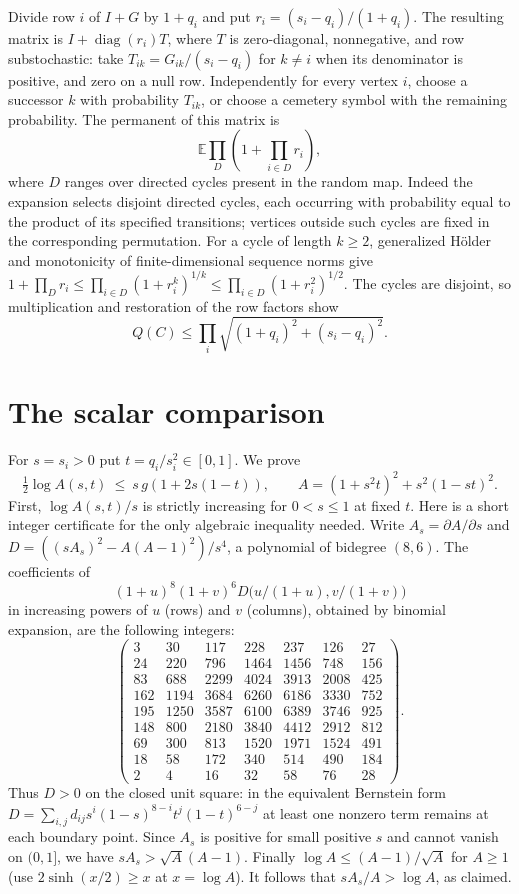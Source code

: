 \documentclass[11pt]{article}
\newcommand{\E}{\mathbb E}
\begin{document}
Divide row $i$ of $I+G$ by $1+q_i$ and put
$r_i=(s_i-q_i)/(1+q_i)$. The resulting matrix is
$I+\operatorname{diag}(r_i)T$, where $T$ is zero-diagonal,
nonnegative, and row substochastic: take $T_{ik}=G_{ik}/(s_i-q_i)$
for $k\ne i$ when its denominator is positive, and zero on a null
row. Independently for every vertex $i$, choose a successor $k$ with
probability $T_{ik}$, or choose a cemetery symbol with the remaining
probability. The permanent of this matrix is
\[
 \E\prod_{D}\left(1+\prod_{i\in D}r_i\right),
\]
where $D$ ranges over directed cycles present in the random map.
Indeed the expansion selects disjoint directed cycles, each occurring
with probability equal to the product of its specified transitions;
vertices outside such cycles are fixed in the corresponding permutation.
For a cycle of length $k\ge2$, generalized H\"older and monotonicity
of finite-dimensional sequence norms give
$1+\prod_D r_i\le\prod_{i\in D}(1+r_i^k)^{1/k}
\le\prod_{i\in D}(1+r_i^2)^{1/2}$.
The cycles are disjoint, so multiplication and restoration of the row
factors show
\begin{equation}\label{ub}
 Q(C)\le\prod_i\sqrt{(1+q_i)^2+(s_i-q_i)^2}.
\end{equation}

\section{The scalar comparison}
For $s=s_i>0$ put $t=q_i/s_i^2\in[0,1]$. We prove
\[
 \tfrac12\log A(s,t)\ \le\ s\,g(1+2s(1-t)),
 \qquad A=(1+s^2t)^2+s^2(1-st)^2 .
\]
First, $\log A(s,t)/s$ is strictly increasing for $0<s\le1$ at
fixed $t$. Here is a short integer certificate for the only algebraic
inequality needed. Write $A_s=\partial A/\partial s$ and
$D=((sA_s)^2-A(A-1)^2)/s^4$, a polynomial of bidegree $(8,6)$.
The coefficients of
\[
 (1+u)^8(1+v)^6 D\big(u/(1+u),v/(1+v)\big)
\]
in increasing powers of $u$ (rows) and $v$ (columns), obtained by
binomial expansion, are the following integers:
\[
\begin{pmatrix}
3&30&117&228&237&126&27\\
24&220&796&1464&1456&748&156\\
83&688&2299&4024&3913&2008&425\\
162&1194&3684&6260&6186&3330&752\\
195&1250&3587&6100&6389&3746&925\\
148&800&2180&3840&4412&2912&812\\
69&300&813&1520&1971&1524&491\\
18&58&172&340&514&490&184\\
2&4&16&32&58&76&28
\end{pmatrix}.
\]
Thus $D>0$ on the closed unit square: in the equivalent Bernstein form
$D=\sum_{i,j}d_{ij}s^i(1-s)^{8-i}t^j(1-t)^{6-j}$ at least one
nonzero term remains at each boundary point. Since $A_s$ is positive
for small positive $s$ and cannot vanish on $(0,1]$, we have
$sA_s>\sqrt A(A-1)$. Finally $\log A\le(A-1)/\sqrt A$ for
$A\ge1$ (use $2\sinh(x/2)\ge x$ at $x=\log A$).
It follows that $sA_s/A>\log A$, as claimed.
\end{document}
